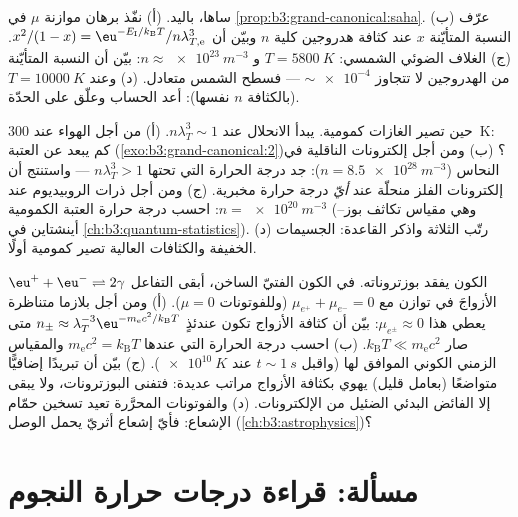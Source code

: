 \begin{exercise}[$\star\star\star$]\label{exo:b3:grand-canonical:10}
ساها، باليد. (أ) نفّذ برهان موازنة $\mu$ في
\cref{prop:b3:grand-canonical:saha}. (ب) عرّف النسبة
المتأيّنة $x$ عند كثافة هدروجين كلية $n$ وبيّن أن $x^2/(1 - x)
= \eu^{-E_{\text{I}}/k_{\text{B}}T}/n\lambda_{T,\text{e}}^3$. (ج)
الغلاف الضوئي الشمسي: $T = \qty{5800}{K}$ و $n \approx
\qty{e23}{m^{-3}}$: بيّن أن النسبة المتأيّنة من الهدروجين لا تتجاوز
$\sim\num{e-4}$ --- فسطح الشمس متعادل. (د) وعند $T =
\qty{10000}{K}$ (بالكثافة $n$ نفسها): أعد الحساب وعلّق على
الحدّة.
\end{exercise}

\begin{exercise}[$\star\star\star$]\label{exo:b3:grand-canonical:11}
حين تصير الغازات كمومية. يبدأ الانحلال عند $n\lambda_T^3 \sim
1$. (أ) من أجل الهواء عند \qty{300}{K}: كم يبعد عن العتبة
(\cref{exo:b3:grand-canonical:2})؟ (ب) ومن أجل إلكترونات الناقلية
في النحاس ($n = \qty{8.5e28}{m^{-3}}$): جد درجة الحرارة التي
تحتها $n\lambda_T^3 > 1$ --- واستنتج أن إلكترونات الفلز
منحلّة عند \emph{أيّ} درجة حرارة مخبرية.
(ج) ومن أجل ذرات الروبيديوم عند $n = \qty{e20}{m^{-3}}$: احسب درجة
حرارة العتبة الكمومية (وهي مقياس تكاثف بوز--أينشتاين في
\cref{ch:b3:quantum-statistics}). (د) رتّب الثلاثة واذكر
القاعدة: الجسيمات الخفيفة والكثافات العالية تصير كمومية أولًا.
\end{exercise}

\begin{exercise}[$\star\star\star$]\label{exo:b3:grand-canonical:12}
الكون يفقد بوزتروناته. في الكون الفتيّ الساخن، أبقى التفاعل
$\eu^+ + \eu^- \rightleftharpoons 2\gamma$ الأزواجَ في
توازن مع $\mu_{e^+} + \mu_{e^-} = 0$ (وللفوتونات $\mu = 0$).
(أ) ومن أجل بلازما متناظرة يعطي هذا $\mu_{e^\pm} \approx 0$:
بيّن أن كثافة الأزواج تكون عندئذٍ $n_\pm \approx
\lambda_T^{-3}\eu^{-m_{\text{e}}c^2/k_{\text{B}}T}$ متى صار
$k_{\text{B}}T \ll m_{\text{e}}c^2$. (ب) احسب درجة الحرارة
التي عندها $m_{\text{e}}c^2 = k_{\text{B}}T$ والمقياس الزمني
الكوني الموافق لها (واقبل $t \sim \qty{1}{s}$ عند
$\qty{e10}{K}$). (ج) بيّن أن تبريدًا إضافيًّا متواضعًا (بعامل
قليل) يهوي بكثافة الأزواج مراتب عديدة:
فتفنى البوزترونات، ولا يبقى إلا الفائض البدئي الضئيل
من الإلكترونات. (د) والفوتونات المحرَّرة تعيد تسخين حمّام
الإشعاع: فأيّ إشعاع أثريّ يحمل الوصل
(\cref{ch:b3:astrophysics})؟
\end{exercise}

\section{مسألة: قراءة درجات حرارة النجوم}

